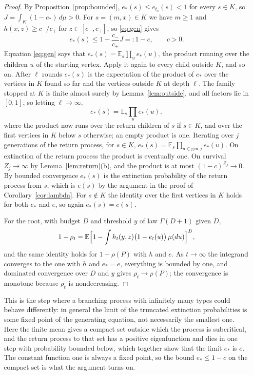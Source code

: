 \documentclass[11pt]{amsart}
\theoremstyle{remark}
\numberwithin{equation}{section}
\newcommand{\E}{\mathbb E}
\newcommand{\1}{\mathbf 1}
\begin{document}
\begin{proof}
By Proposition~\ref{prop:bounded}, $e_*(s)\le e_{t_0}(s)<1$ for every $s\in K$, so $J=\int_K(1-e_*)\,d\mu>0$. For $s=(m,x)\in K$ we have $m\ge1$ and $h(x,z)\ge c_-/c_+$ for $z\in[c_-,c_+]$, so \eqref{eq:gen} gives
\[
e_*(s)\le1-\frac{c_-}{c_+}J=:1-c,\qquad c>0 .
\]
Equation \eqref{eq:gen} says that $e_*(s)=\E_s\prod_{u}e_*(u)$, the product running over the children $u$ of the starting vertex. Apply it again to every child outside $K$, and so on. After $\ell$ rounds $e_*(s)$ is the expectation of the product of $e_*$ over the vertices in $K$ found so far and the vertices outside $K$ at depth $\ell$. The family stopped at $K$ is finite almost surely by Lemma~\ref{lem:outside}, and all factors lie in $[0,1]$, so letting $\ell\to\infty$,
\[
e_*(s)=\E_s\prod_{u}e_*(u),
\]
where the product now runs over the return children of $s$ if $s\in K$, and over the first vertices in $K$ below $s$ otherwise; an empty product is one. Iterating over $j$ generations of the return process, for $s\in K$, $e_*(s)=\E_s\prod_{u\in\text{gen }j}e_*(u)$. On extinction of the return process the product is eventually one. On survival $Z_j\to\infty$ by Lemma~\ref{lem:return}(b), and the product is at most $(1-c)^{Z_j}\to0$. By bounded convergence $e_*(s)$ is the extinction probability of the return process from $s$, which is $e(s)$ by the argument in the proof of Corollary~\ref{cor:lambda}. For $s\notin K$ the identity over the first vertices in $K$ holds for both $e_*$ and $e$, so again $e_*(s)=e(s)$.

For the root, with budget $D$ and threshold $y$ of law $\Gamma(D+1)$ given $D$,
\[
1-\rho_t=\E\Bigl[1-\int h_t(y,z)\bigl(1-e_t(u)\bigr)\,\mu(du)\Bigr]^D ,
\]
and the same identity holds for $1-\rho(P)$ with $h$ and $e$. As $t\to\infty$ the integrand converges to the one with $h$ and $e_*=e$, everything is bounded by one, and dominated convergence over $D$ and $y$ gives $\rho_t\to\rho(P)$; the convergence is monotone because $\rho_t$ is nondecreasing.
\end{proof}

This is the step where a branching process with infinitely many types could behave differently: in general the limit of the truncated extinction probabilities is some fixed point of the generating equation, not necessarily the smallest one. Here the finite mean gives a compact set outside which the process is subcritical, and the return process to that set has a positive eigenfunction and dies in one step with probability bounded below, which together show that the limit $e_*$ is $e$. The constant function one is always a fixed point, so the bound $e_*\le1-c$ on the compact set is what the argument turns on.
\end{document}

